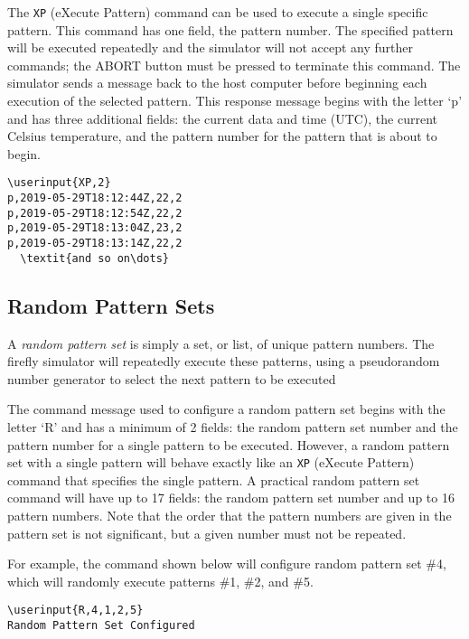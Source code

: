 \documentclass[letterpaper,11pt]{article}
\newcommand\userinput[1]{\textbf{#1}}
\begin{document}
The \texttt{XP} (eXecute Pattern) command can be used to execute a single
specific pattern.  This command has one field, the pattern number.
The specified pattern will be executed repeatedly and the simulator will
not accept any further commands; the \textsf{ABORT} button must be pressed
to terminate this command.  The simulator sends a message back to the host
computer before beginning each execution of the selected pattern. This
response message begins with the letter `p' and has three additional fields:
the current data and time (UTC), the current Celsius temperature, and the
pattern number for the pattern that is about to begin.

\begin{tcolorbox}
\begin{Verbatim}[commandchars=\\\{\}]
\userinput{XP,2}
p,2019-05-29T18:12:44Z,22,2
p,2019-05-29T18:12:54Z,22,2
p,2019-05-29T18:13:04Z,23,2
p,2019-05-29T18:13:14Z,22,2
  \textit{and so on\dots}
\end{Verbatim}
\end{tcolorbox}

\subsection*{Random Pattern Sets}

A \textit{random pattern set} is simply a set, or list, of unique pattern
numbers. The firefly simulator will repeatedly execute these patterns, using
a pseudorandom number generator to select the next pattern to be executed

The command message used to configure a random pattern set begins with the
letter `R' and has a minimum of 2 fields: the random pattern set number and
the pattern number for a single pattern to be executed. However, a random
pattern set with a single pattern will behave exactly like an \texttt{XP}
(eXecute Pattern) command that specifies the single pattern. A practical random
pattern set command will have up to 17 fields: the random pattern set number
and up to 16 pattern numbers. Note that the order that the pattern numbers are
given in the pattern set is not significant, but a given number must not be
repeated.

For example, the command shown below will configure random pattern set \#4,
which will randomly execute patterns \#1, \#2, and \#5.
\begin{tcolorbox}
\begin{Verbatim}[commandchars=\\\{\}]
\userinput{R,4,1,2,5}
Random Pattern Set Configured
\end{Verbatim}
\end{tcolorbox}
\end{document}
